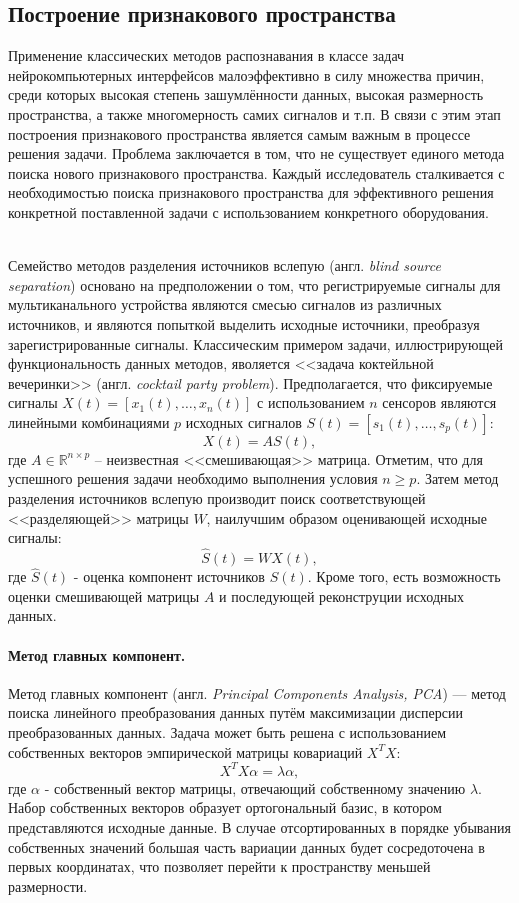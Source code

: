 \documentclass[12pt,a4paper,oneside,fleqn,leqno]{article}
\newcounter{pe} %
\newcommand*{\Nep}{\addtocounter{pe}{1}{\arabic{pe}$^{\circ}$.\;}}
\newcommand*{\NepS}{\mbox{} \\ \Nep}
\begin{document}
	\subsection{Построение признакового пространства}
	\par Применение классических методов распознавания в классе задач нейрокомпьютерных интерфейсов малоэффективно в силу множества причин, среди которых высокая степень зашумлённости данных, высокая размерность пространства, а также многомерность самих сигналов и т.п. В связи с этим этап построения признакового пространства является самым важным в процессе решения задачи. Проблема заключается в том, что не существует единого метода поиска нового признакового пространства. Каждый исследователь сталкивается с необходимостью поиска признакового пространства для эффективного решения конкретной поставленной задачи с использованием конкретного оборудования. \\
	\setcounter{pe}{0}
	\NepS {\bf Разделение источников вслепую}
	\par Семейство методов разделения источников вслепую (англ. {\it blind source separation}) основано на предположении о том, что регистрируемые сигналы для мультиканального устройства являются смесью сигналов из различных источников, и являются попыткой выделить исходные источники, преобразуя зарегистрированные сигналы. Классическим примером задачи, иллюстрирующей функциональность данных методов, яволяется <<задача коктейльной вечеринки>> (англ. {\it cocktail party problem}). Предполагается, что фиксируемые сигналы $X(t) = [x_1(t), \dots, x_n(t)]$ с использованием $n$ сенсоров являются линейными комбинациями $p$ исходных сигналов $S(t) = [s_1(t), \dots, s_p(t)]$:
$$X(t) = AS(t),$$
	где $A \in \mathbb{R}^{n \times p}$ -- неизвестная <<смешивающая>> матрица. Отметим, что для успешного решения задачи необходимо выполнения условия $n \geqslant p.$ Затем метод разделения источников вслепую производит поиск соответствующей <<разделяющей>> матрицы $W$, наилучшим образом оценивающей исходные сигналы:
$$\widehat{S}(t) = WX(t),$$
	где $\widehat{S}(t)$ - оценка компонент источников $S(t)$. Кроме того, есть возможность оценки смешивающей матрицы $A$ и последующей реконструции исходных данных.
	\paragraph{Метод главных компонент.}
	\par Метод главных компонент (англ. {\it Principal Components Analysis, PCA}) — метод поиска линейного преобразования данных путём максимизации дисперсии преобразованных данных. Задача может быть решена с использованием собственных векторов эмпирической матрицы ковариаций $X^TX$:
$$X^TX \alpha = \lambda \alpha,$$
	где $\alpha$ - собственный вектор матрицы, отвечающий собственному значению $\lambda$. Набор собственных векторов образует ортогональный базис, в котором представляются исходные данные. В случае отсортированных в порядке убывания собственных значений большая часть вариации данных будет сосредоточена в первых координатах, что позволяет перейти к пространству меньшей размерности.
\end{document}

